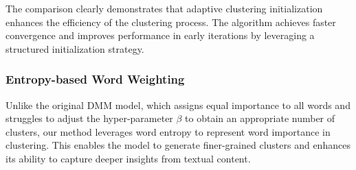 The comparison clearly demonstrates that adaptive clustering initialization enhances the efficiency of the clustering process. The \sysname{} algorithm achieves faster convergence and improves performance in early iterations by leveraging a structured initialization strategy. 


\subsubsection{Entropy-based Word Weighting}
Unlike the original DMM model, which assigns equal importance to all words and struggles to adjust the hyper-parameter $\beta$ to obtain an appropriate number of clusters, our method leverages word entropy to represent word importance in clustering. This enables the model to generate finer-grained clusters and enhances its ability to capture deeper insights from textual content.

